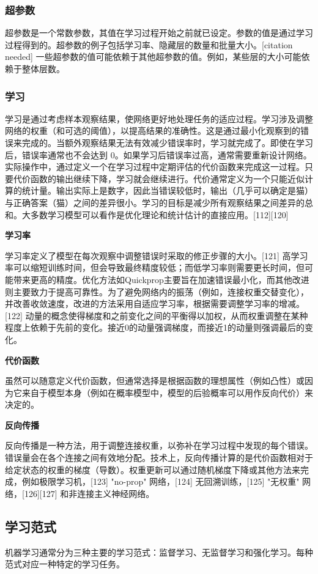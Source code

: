 \subsubsection{超参数}   
超参数是一个常数参数，其值在学习过程开始之前就已设定。参数的值是通过学习过程得到的。超参数的例子包括学习率、隐藏层的数量和批量大小。[citation needed] 一些超参数的值可能依赖于其他超参数的值。例如，某些层的大小可能依赖于整体层数。
\subsubsection{学习}
学习是通过考虑样本观察结果，使网络更好地处理任务的适应过程。学习涉及调整网络的权重（和可选的阈值），以提高结果的准确性。这是通过最小化观察到的错误来完成的。当额外观察结果无法有效减少错误率时，学习就完成了。即使在学习后，错误率通常也不会达到 0。如果学习后错误率过高，通常需要重新设计网络。实际操作中，通过定义一个在学习过程中定期评估的代价函数来完成这一过程。只要代价函数的输出继续下降，学习就会继续进行。代价通常定义为一个只能近似计算的统计量。输出实际上是数字，因此当错误较低时，输出（几乎可以确定是猫）与正确答案（猫）之间的差异很小。学习的目标是减少所有观察结果之间差异的总和。大多数学习模型可以看作是优化理论和统计估计的直接应用。[112][120]

\textbf{学习率}

学习率定义了模型在每次观察中调整错误时采取的修正步骤的大小。[121] 高学习率可以缩短训练时间，但会导致最终精度较低；而低学习率则需要更长时间，但可能带来更高的精度。优化方法如Quickprop主要旨在加速错误最小化，而其他改进则主要致力于提高可靠性。为了避免网络内的振荡（例如，连接权重交替变化），并改善收敛速度，改进的方法采用自适应学习率，根据需要调整学习率的增减。[122] 动量的概念使得梯度和之前变化之间的平衡得以加权，从而权重调整在某种程度上依赖于先前的变化。接近0的动量强调梯度，而接近1的动量则强调最后的变化。

\textbf{代价函数}

虽然可以随意定义代价函数，但通常选择是根据函数的理想属性（例如凸性）或因为它来自于模型本身（例如在概率模型中，模型的后验概率可以用作反向代价）来决定的。

\textbf{反向传播}

反向传播是一种方法，用于调整连接权重，以弥补在学习过程中发现的每个错误。错误量会在各个连接之间有效地分配。技术上，反向传播计算的是代价函数相对于给定状态的权重的梯度（导数）。权重更新可以通过随机梯度下降或其他方法来完成，例如极限学习机，[123] "no-prop" 网络，[124] 无回溯训练，[125] "无权重" 网络，[126][127] 和非连接主义神经网络。
\subsection{学习范式}
机器学习通常分为三种主要的学习范式：监督学习、无监督学习和强化学习。每种范式对应一种特定的学习任务。

